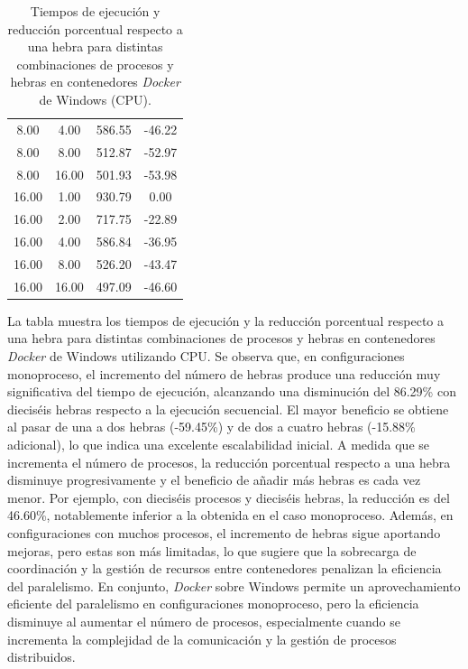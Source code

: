 \begin{table}[ht]
\begin{tabular}{|c|c|c|c|}
        8.00              & 4.00            & 586.55              & -46.22                         \\
        8.00              & 8.00            & 512.87              & -52.97                         \\
        8.00              & 16.00           & 501.93              & -53.98                         \\
        16.00             & 1.00            & 930.79              & 0.00                           \\
        16.00             & 2.00            & 717.75              & -22.89                         \\
        16.00             & 4.00            & 586.84              & -36.95                         \\
        16.00             & 8.00            & 526.20              & -43.47                         \\
        16.00             & 16.00           & 497.09              & -46.60                         \\
        \hline
    \end{tabular}
    \caption{Tiempos de ejecución y reducción porcentual respecto a una hebra para distintas combinaciones de procesos y hebras en contenedores \textit{Docker} de Windows (CPU).}
    \label{tab:thread_sweep_windows_docker_time}
\end{table}

La tabla muestra los tiempos de ejecución y la reducción porcentual respecto a una hebra para distintas combinaciones de procesos y hebras en contenedores \textit{Docker} de Windows utilizando CPU. Se observa que, en configuraciones monoproceso, el incremento del número de hebras produce una reducción muy significativa del tiempo de ejecución, alcanzando una disminución del 86.29\% con dieciséis hebras respecto a la ejecución secuencial. El mayor beneficio se obtiene al pasar de una a dos hebras (-59.45\%) y de dos a cuatro hebras (-15.88\% adicional), lo que indica una excelente escalabilidad inicial. A medida que se incrementa el número de procesos, la reducción porcentual respecto a una hebra disminuye progresivamente y el beneficio de añadir más hebras es cada vez menor. Por ejemplo, con dieciséis procesos y dieciséis hebras, la reducción es del 46.60\%, notablemente inferior a la obtenida en el caso monoproceso. Además, en configuraciones con muchos procesos, el incremento de hebras sigue aportando mejoras, pero estas son más limitadas, lo que sugiere que la sobrecarga de coordinación y la gestión de recursos entre contenedores penalizan la eficiencia del paralelismo. En conjunto, \textit{Docker} sobre Windows permite un aprovechamiento eficiente del paralelismo en configuraciones monoproceso, pero la eficiencia disminuye al aumentar el número de procesos, especialmente cuando se incrementa la complejidad de la comunicación y la gestión de procesos distribuidos.

